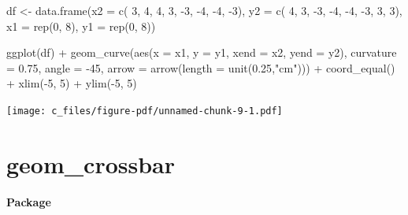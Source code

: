 \documentclass[
  letterpaper,
  DIV=11,
  numbers=noendperiod]{scrreprt}
\newenvironment{Shaded}{\begin{snugshade}}{\end{snugshade}}
\newcommand{\AttributeTok}[1]{\textcolor[rgb]{0.40,0.45,0.13}{#1}}
\newcommand{\DecValTok}[1]{\textcolor[rgb]{0.68,0.00,0.00}{#1}}
\newcommand{\FloatTok}[1]{\textcolor[rgb]{0.68,0.00,0.00}{#1}}
\newcommand{\FunctionTok}[1]{\textcolor[rgb]{0.28,0.35,0.67}{#1}}
\newcommand{\NormalTok}[1]{\textcolor[rgb]{0.00,0.23,0.31}{#1}}
\newcommand{\OtherTok}[1]{\textcolor[rgb]{0.00,0.23,0.31}{#1}}
\newcommand{\SpecialCharTok}[1]{\textcolor[rgb]{0.37,0.37,0.37}{#1}}
\newcommand{\StringTok}[1]{\textcolor[rgb]{0.13,0.47,0.30}{#1}}
\begin{document}
\begin{Shaded}
\begin{Highlighting}[]
\NormalTok{df }\OtherTok{\textless{}{-}} \FunctionTok{data.frame}\NormalTok{(}\AttributeTok{x2 =} \FunctionTok{c}\NormalTok{( }\DecValTok{3}\NormalTok{, }\DecValTok{4}\NormalTok{, }\DecValTok{4}\NormalTok{, }\DecValTok{3}\NormalTok{, }\SpecialCharTok{{-}}\DecValTok{3}\NormalTok{, }\SpecialCharTok{{-}}\DecValTok{4}\NormalTok{, }\SpecialCharTok{{-}}\DecValTok{4}\NormalTok{, }\SpecialCharTok{{-}}\DecValTok{3}\NormalTok{),}
                 \AttributeTok{y2 =} \FunctionTok{c}\NormalTok{( }\DecValTok{4}\NormalTok{, }\DecValTok{3}\NormalTok{, }\SpecialCharTok{{-}}\DecValTok{3}\NormalTok{, }\SpecialCharTok{{-}}\DecValTok{4}\NormalTok{, }\SpecialCharTok{{-}}\DecValTok{4}\NormalTok{, }\SpecialCharTok{{-}}\DecValTok{3}\NormalTok{, }\DecValTok{3}\NormalTok{, }\DecValTok{3}\NormalTok{),}
                 \AttributeTok{x1 =} \FunctionTok{rep}\NormalTok{(}\DecValTok{0}\NormalTok{, }\DecValTok{8}\NormalTok{),}
                 \AttributeTok{y1 =} \FunctionTok{rep}\NormalTok{(}\DecValTok{0}\NormalTok{, }\DecValTok{8}\NormalTok{))}

\FunctionTok{ggplot}\NormalTok{(df) }\SpecialCharTok{+} 
  \FunctionTok{geom\_curve}\NormalTok{(}\FunctionTok{aes}\NormalTok{(}\AttributeTok{x =}\NormalTok{ x1, }\AttributeTok{y =}\NormalTok{ y1, }\AttributeTok{xend =}\NormalTok{ x2, }\AttributeTok{yend =}\NormalTok{ y2),}
             \AttributeTok{curvature =} \FloatTok{0.75}\NormalTok{, }\AttributeTok{angle =} \SpecialCharTok{{-}}\DecValTok{45}\NormalTok{,}
             \AttributeTok{arrow =} \FunctionTok{arrow}\NormalTok{(}\AttributeTok{length =} \FunctionTok{unit}\NormalTok{(}\FloatTok{0.25}\NormalTok{,}\StringTok{"cm"}\NormalTok{))) }\SpecialCharTok{+} 
  \FunctionTok{coord\_equal}\NormalTok{() }\SpecialCharTok{+}
  \FunctionTok{xlim}\NormalTok{(}\SpecialCharTok{{-}}\DecValTok{5}\NormalTok{, }\DecValTok{5}\NormalTok{) }\SpecialCharTok{+} \FunctionTok{ylim}\NormalTok{(}\SpecialCharTok{{-}}\DecValTok{5}\NormalTok{, }\DecValTok{5}\NormalTok{)}
\end{Highlighting}
\end{Shaded}

\texttt{[image: c\_files/figure-pdf/unnamed-chunk-9-1.pdf]}

\section{geom\_crossbar}\label{crossbar}

\textbf{Package}
\end{document}
